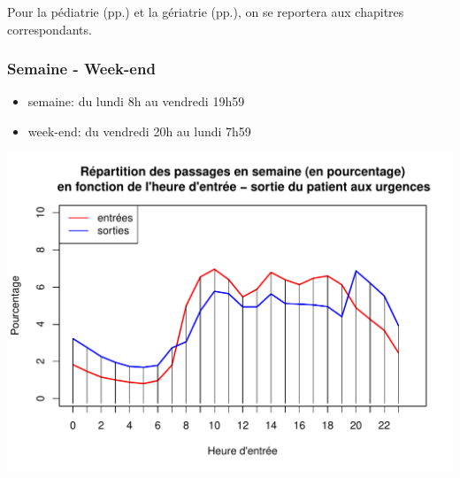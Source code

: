 \documentclass[12pt,english,french,twoside]{book}\usepackage[]{graphicx}\usepackage[]{color}
\makeatletter
\def\maxwidth{ %
  \ifdim\Gin@nat@width>\linewidth
    \linewidth
  \else
    \Gin@nat@width
  \fi
}
\newenvironment{knitrout}{}{} %
\makeatother
\begin{document}
Pour la pédiatrie (pp.\pageref{chap_pediatrie}) et la gériatrie (pp.\pageref{chap_geriatrie}), on se reportera aux chapitres correspondants.

\subsubsection*{Semaine - Week-end}


\begin{itemize}
  \item semaine: du lundi 8h au vendredi 19h59
  \item week-end: du vendredi 20h au lundi 7h59
\end{itemize}





\begin{center}
\begin{knitrout}
\color{fgcolor}
\includegraphics[width=\maxwidth]{figure/graphe_es_we-1} 

\end{knitrout}
\label{fig:graphe_es_we} %
\end{center}


\end{document}
